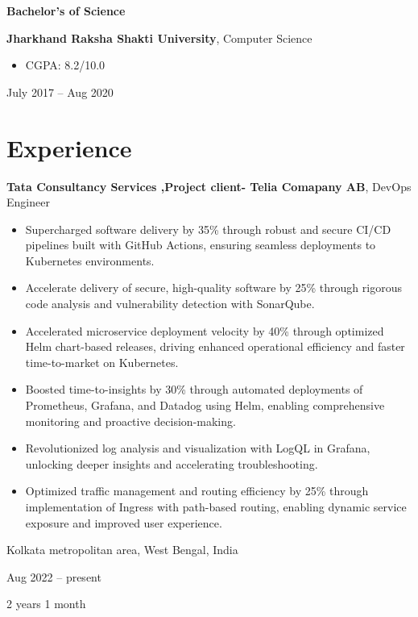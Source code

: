 \documentclass[10pt, letterpaper]{article}
\newenvironment{highlights}{
    \begin{itemize}[
        topsep=0.10 cm,
        parsep=0.10 cm,
        partopsep=0pt,
        itemsep=0pt,
        leftmargin=0.4 cm + 10pt
    ]
}{
    \end{itemize}
} %
\newenvironment{twocolentry}[2][]{
    \onecolentry
    \def\secondColumn{#2}
    \setcolumnwidth{\fill, 4.5 cm}
    \begin{paracol}{2}
}{
    \switchcolumn \raggedleft \secondColumn
    \end{paracol}
    \endonecolentry
} %
\newenvironment{threecolentry}[3][]{
    \onecolentry
    \def\thirdColumn{#3}
    \setcolumnwidth{1 cm, \fill, 4.5 cm}
    \begin{paracol}{3}
    {\raggedright #2} \switchcolumn
}{
    \switchcolumn \raggedleft \thirdColumn
    \end{paracol}
    \endonecolentry
} %
\begin{document}
        
        \begin{threecolentry}{\textbf{Bachelor's of Science}}{
            July 2017 – Aug 2020
        }
            \textbf{Jharkhand Raksha Shakti University}, Computer Science
            \begin{highlights}
                \item CGPA: 8.2/10.0
            \end{highlights}
        \end{threecolentry}


    
    \section{Experience}



        
        \begin{twocolentry}{
            Kolkata metropolitan area, West Bengal, India

        Aug 2022 – present

        2 years 1 month
        }
            \textbf{Tata Consultancy Services ,Project client- Telia Comapany AB}, DevOps Engineer
            \begin{highlights}
                \item Supercharged software delivery by 35\% through robust and secure CI/CD pipelines built with GitHub Actions, ensuring seamless deployments to Kubernetes environments.
                \item Accelerate delivery of secure, high-quality software by 25\% through rigorous code analysis and vulnerability detection with SonarQube.
                \item Accelerated microservice deployment velocity by 40\% through optimized Helm chart-based releases, driving enhanced operational efficiency and faster time-to-market on Kubernetes.
                \item Boosted time-to-insights by 30\% through automated deployments of Prometheus, Grafana, and Datadog using Helm, enabling comprehensive monitoring and proactive decision-making.
                \item Revolutionized log analysis and visualization with LogQL in Grafana, unlocking deeper insights and accelerating troubleshooting.
                \item Optimized traffic management and routing efficiency by 25\% through implementation of Ingress with path-based routing, enabling dynamic service exposure and improved user experience.
            \end{highlights}
        \end{twocolentry}
\end{document}
